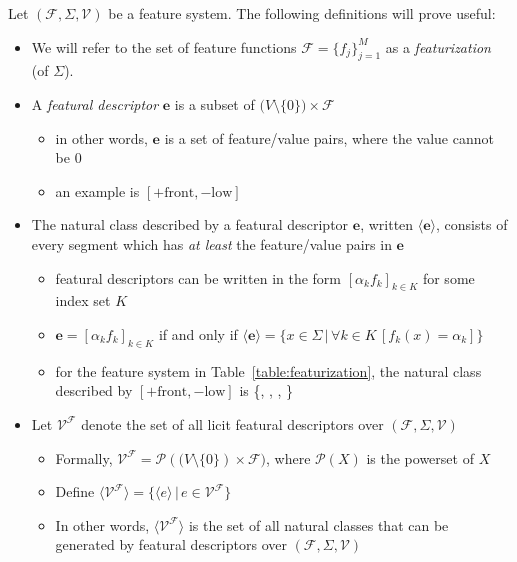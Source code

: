 \documentclass[11pt, oneside]{article}   	%
\begin{document}
\vspace{\baselineskip} \noindent Let $(\mathcal F, \Sigma, \mathcal V)$ be a feature system. The following definitions will prove useful: \begin{itemize}
    \item We will refer to the set of feature functions $\mathcal F = \{f_j\}_{j=1}^M$ as a \textit{featurization} (of $\Sigma$). 
    \item A \textit{featural descriptor} $\mathbf{e}$ is a subset of $\mathcal (V \setminus \{0\}) \times \mathcal F$ \begin{itemize}
        \item in other words, $\mathbf{e}$ is a set of feature/value pairs, where the value cannot be $0$
        \item an example is $[+ \text{front}, - \text{low}]$
        \end{itemize}
    \item The natural class described by a featural descriptor $\mathbf{e}$, written $\langle \mathbf{e} \rangle$, consists of every segment which has \textit{at least} the feature/value pairs in $\mathbf{e}$ \begin{itemize}
        \item featural descriptors can be written in the form $[\alpha_k f_k]_{k \in K}$ for some index set $K$
        \item $\mathbf{e} = [\alpha_k f_k]_{k \in K}$ if and only if $\langle \mathbf{e} \rangle = \{x \in \Sigma \, | \, \forall k \in K \, [ f_k(x) = \alpha_k ] \}$
        \item for the feature system in Table~\ref{table:featurization}, the natural class described by $[+ \text{front}, - \text{low}]$ is \{, , , \textipa{\oe}\}
        \end{itemize}
    \item Let $\mathcal V^\mathcal F$ denote the set of all licit featural descriptors over $(\mathcal F, \Sigma, \mathcal V)$ \begin{itemize}
        \item Formally, $\mathcal V^\mathcal F = \mathcal P(\mathcal (V \setminus \{0\}) \times \mathcal F)$, where $\mathcal P(X)$ is the powerset of $X$
        \item Define $\langle \mathcal V^\mathcal F \rangle = \{ \langle e \rangle \, | \, e \in \mathcal V^\mathcal F \}$
        \item In other words, $\langle \mathcal V^\mathcal F \rangle$ is the set of all natural classes that can be generated by featural descriptors over $(\mathcal F, \Sigma, \mathcal V)$
        \end{itemize}
    \end {itemize}
    
\end{document}
